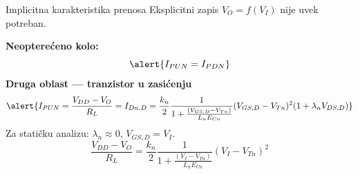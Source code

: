 \begin{frame}[label=09_1-s013]{Implicitna karakteristika prenosa}\setlength{\parskip}{2pt}\setlength{\abovedisplayskip}{4pt}\setlength{\belowdisplayskip}{4pt}\setlength{\abovedisplayshortskip}{3pt}\setlength{\belowdisplayshortskip}{3pt}
Eksplicitni zapis $V_O=f(V_I)$ nije uvek potreban.\par\textbf{Neopterećeno kolo:}\[\alert{I_{PUN}=I_{PDN}}\]
\textbf{Druga oblast — tranzistor u zasićenju}\[\alert{I_{PUN}=\frac{V_{DD}-V_O}{R_L}=I_{Dn,D}=\frac{k_n}{2}\frac1{1+\frac{(V_{GS,D}-V_{Tn})}{L_nE_{Cn}}}(V_{GS,D}-V_{Tn})^2(1+\lambda_nV_{DS,D})}\]
\medskip Za statičku analizu: $\lambda_n\approx0$, $V_{GS,D}=V_I$.\[\frac{V_{DD}-V_O}{R_L}=\frac{k_n}{2}\frac1{1+\frac{(V_I-V_{Tn})}{L_nE_{Cn}}}(V_I-V_{Tn})^2\]

\end{frame}
